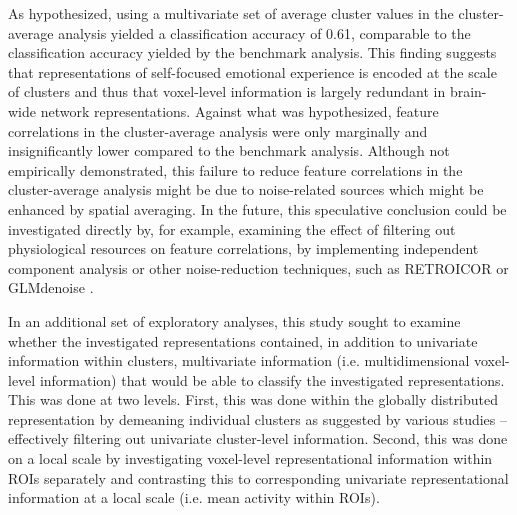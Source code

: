 \documentclass[jou,12pt,a4paper]{apa6}
\begin{document}
As hypothesized, using a multivariate set of average cluster values in the cluster-average analysis yielded a classification accuracy of 0.61, comparable to the classification accuracy yielded by the benchmark analysis. This finding suggests that representations of self-focused emotional experience is encoded at the scale of clusters and thus that voxel-level information is largely redundant in brain-wide network representations. Against what was hypothesized, feature correlations in the cluster-average analysis were only marginally and insignificantly lower compared to the benchmark analysis. Although not empirically demonstrated, this failure to reduce feature correlations in the cluster-average analysis might be due to noise-related sources which might be enhanced by spatial averaging. In the future, this speculative conclusion could be investigated directly by, for example, examining the effect of filtering out physiological resources on feature correlations, by implementing independent component analysis or other noise-reduction techniques, such as RETROICOR \cite{glover2000} or GLMdenoise \cite{kay2013}.

In an additional set of exploratory analyses, this study sought to examine whether the investigated representations contained, in addition to univariate information within clusters, multivariate information (i.e. multidimensional voxel-level information) that would be able to classify the investigated representations. This was done at two levels. First, this was done within the globally distributed representation by demeaning individual clusters as suggested by various studies \cite{kriegeskorte2006,coutanche2013} -- effectively filtering out univariate cluster-level information. Second, this was done on a local scale by investigating voxel-level representational information within ROIs separately and contrasting this to corresponding univariate representational information at a local scale (i.e. mean activity within ROIs). 
\end{document}

